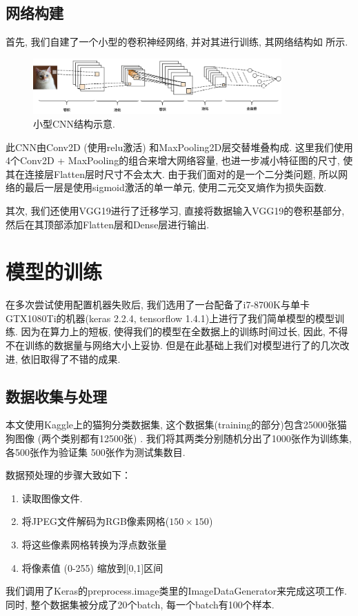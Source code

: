 \documentclass[lang=cn,11pt]{elegantpaper}
\begin{document}
\subsection{网络构建}

首先, 我们自建了一个小型的卷积神经网络, 并对其进行训练, 其网络结构如  所示. 
\begin{figure}[htbp]
	\centering
	  \includegraphics[width=0.85\textwidth]{cnn1.png}
	  \tiny
	  \caption{小型CNN结构示意.\label{fig:cnn1}}
\end{figure}

\normalsize
此CNN由Conv2D (使用relu激活) 和MaxPooling2D层交替堆叠构成. 这里我们使用4个Conv2D + MaxPooling的组合来增大网络容量, 也进一步减小特征图的尺寸, 使其在连接层Flatten层时尺寸不会太大. 由于我们面对的是一个二分类问题, 所以网络的最后一层是使用sigmoid激活的单一单元, 使用二元交叉熵作为损失函数. 

其次, 我们还使用VGG19进行了迁移学习, 直接将数据输入VGG19的卷积基部分, 然后在其顶部添加Flatten层和Dense层进行输出. 

\section{模型的训练}

在多次尝试使用配置机器失败后, 我们选用了一台配备了i7-8700K与单卡GTX1080Ti的机器(keras 2.2.4, tensorflow 1.4.1)上进行了我们简单模型的模型训练. 因为在算力上的短板, 使得我们的模型在全数据上的训练时间过长, 因此, 不得不在训练的数据量与网络大小上妥协. 但是在此基础上我们对模型进行了的几次改进, 依旧取得了不错的成果. 

\subsection{数据收集与处理}
本文使用Kaggle上的猫狗分类数据集, 这个数据集(training的部分)包含25000张猫狗图像 (两个类别都有12500张) . 我们将其两类分别随机分出了1000张作为训练集, 各500张作为验证集 500张作为测试集数目.

  数据预处理的步骤大致如下：

\begin{enumerate}
	\item 读取图像文件.
	\item 将JPEG文件解码为RGB像素网格($150\times 150$)
	\item 将这些像素网格转换为浮点数张量
	\item 将像素值 (0-255) 缩放到[0,1]区间
\end{enumerate}
我们调用了Keras的preprocess.image类里的ImageDataGenerator来完成这项工作. 同时, 整个数据集被分成了20个batch, 每一个batch有100个样本. 
\end{document}

